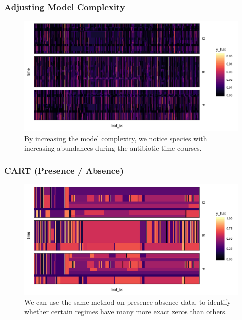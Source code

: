 \documentclass{beamer}
\begin{document}
\begin{frame}
  \frametitle{Adjusting Model Complexity}
  \begin{figure}[ht]
    \centering
    \includegraphics[width=.8\textwidth]{figure/rpart_simple}
    \caption{By increasing the model complexity, we notice species with
      increasing abundances during the antibiotic time
      courses. \label{fig:rpart_simple} }
  \end{figure}
\end{frame}


\begin{frame}
  \frametitle{CART (Presence / Absence)}
  \begin{figure}[ht]
    \centering
    \includegraphics[width=.8\textwidth]{figure/rpart_binary}
    \caption{We can use the same method on presence-absence data, to identify
      whether certain regimes have many more exact zeros than others.
      \label{fig:rpart_binary} }
  \end{figure}
\end{frame}
\end{document}
